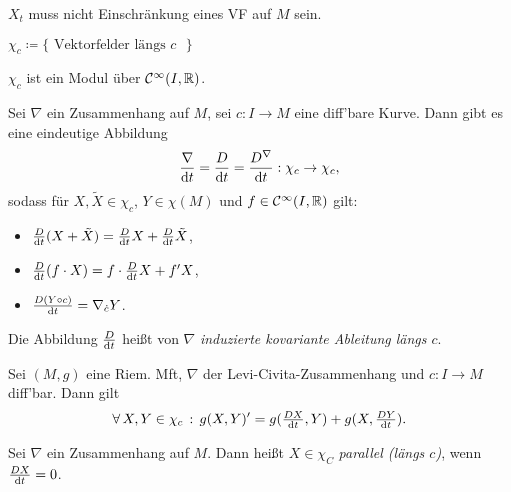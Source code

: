 \documentclass{cheat-sheet}
\begin{document}
\begin{bem}
  $X_t$ muss nicht Einschränkung eines VF auf $M$ sein.
\end{bem}

\begin{nota}
  $\chi_c \coloneqq \{ \text{ Vektorfelder längs $c$ } \}$
\end{nota}

\begin{bem}
  $\chi_c$ ist ein Modul über $\mathcal{C}^\infty(I, \mathbb{R})$.
\end{bem}

\begin{satz}
  Sei $\nabla$ ein Zusammenhang auf $M$, sei $c : I \to M$ eine diff'bare Kurve. Dann gibt es eine eindeutige Abbildung
  \[ \frac{\nabla}{\mathrm{d} t} = \frac{D}{\mathrm{d} t} = \frac{D^\nabla}{\mathrm{d} t} : \chi_c \to \chi_c, \]
  sodass für $X, \tilde{X} \in \chi_c$, $Y \in \chi(M)$ und $f \in \mathcal{C}^\infty(I, \mathbb{R})$ gilt:
  \begin{itemize}
    \item $\tfrac{D}{\mathrm{d} t} (X + \tilde X) = \tfrac{D}{\mathrm{d} t} X + \tfrac{D}{\mathrm{d} t} \tilde{X}$,
    \item $\tfrac{D}{\mathrm{d} t} (f \cdot X) = f \cdot \tfrac{D}{\mathrm{d} t} X + f' X$,
    \item $\tfrac{D (Y \circ c)}{\mathrm{d} t} = \nabla_{\dot{c}} Y$.
  \end{itemize}
\end{satz}

\begin{defn}
  Die Abbildung $\tfrac{D}{\mathrm{d} t}$ heißt von $\nabla$ \emph{induzierte kovariante Ableitung längs $c$}.
\end{defn}


\begin{satz}
  Sei $(M, g)$ eine Riem. Mft, $\nabla$ der Levi-Civita-Zusammenhang und $c : I \to M$ diff'bar. Dann gilt
  \[ \forall \, {X, Y \in \chi_c} \,:\, g(X, Y)' = g(\tfrac{D X}{\mathrm{d} t}, Y) + g(X, \tfrac{D Y}{\mathrm{d} t}). \]
\end{satz}


\begin{defn}
  Sei $\nabla$ ein Zusammenhang auf $M$. Dann heißt $X \in \chi_C$ \emph{parallel (längs $c$)}, wenn $\tfrac{D X}{\mathrm{d} t} = 0$.
\end{defn}
\end{document}
